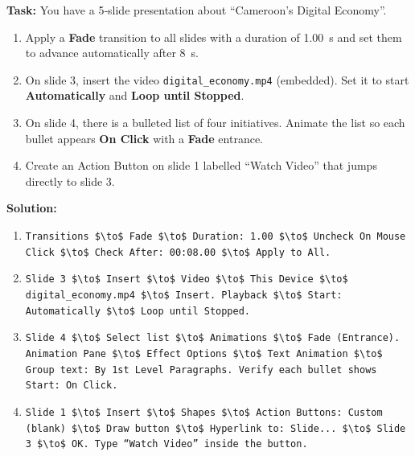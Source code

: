 \documentclass[11pt]{article}
\begin{document}
\begin{exoresolu}
\textbf{Task:} You have a 5‑slide presentation about “Cameroon’s Digital Economy”. 
\begin{enumerate}
\item Apply a \textbf{Fade} transition to all slides with a duration of \SI{1.00}{s} and set them to advance automatically after \SI{8}{s}.
\item On slide 3, insert the video \texttt{digital\_economy.mp4} (embedded). Set it to start \textbf{Automatically} and \textbf{Loop until Stopped}.
\item On slide 4, there is a bulleted list of four initiatives. Animate the list so each bullet appears \textbf{On Click} with a \textbf{Fade} entrance.
\item Create an Action Button on slide 1 labelled “Watch Video” that jumps directly to slide 3.
\end{enumerate}

\textbf{Solution:}
\begin{enumerate}
\item \texttt{Transitions \$\textbackslash{}to\$ Fade \$\textbackslash{}to\$ Duration: 1.00 \$\textbackslash{}to\$ Uncheck On Mouse Click \$\textbackslash{}to\$ Check After: 00:08.00 \$\textbackslash{}to\$ Apply to All.}
\item \texttt{Slide 3 \$\textbackslash{}to\$ Insert \$\textbackslash{}to\$ Video \$\textbackslash{}to\$ This Device \$\textbackslash{}to\$ digital\_economy.mp4 \$\textbackslash{}to\$ Insert. Playback \$\textbackslash{}to\$ Start: Automatically \$\textbackslash{}to\$ Loop until Stopped.}
\item \texttt{Slide 4 \$\textbackslash{}to\$ Select list \$\textbackslash{}to\$ Animations \$\textbackslash{}to\$ Fade (Entrance). Animation Pane \$\textbackslash{}to\$ Effect Options \$\textbackslash{}to\$ Text Animation \$\textbackslash{}to\$ Group text: By 1st Level Paragraphs. Verify each bullet shows Start: On Click.}
\item \texttt{Slide 1 \$\textbackslash{}to\$ Insert \$\textbackslash{}to\$ Shapes \$\textbackslash{}to\$ Action Buttons: Custom (blank) \$\textbackslash{}to\$ Draw button \$\textbackslash{}to\$ Hyperlink to: Slide... \$\textbackslash{}to\$ Slide 3 \$\textbackslash{}to\$ OK. Type “Watch Video” inside the button.}
\end{enumerate}
\end{exoresolu}
\end{document}
